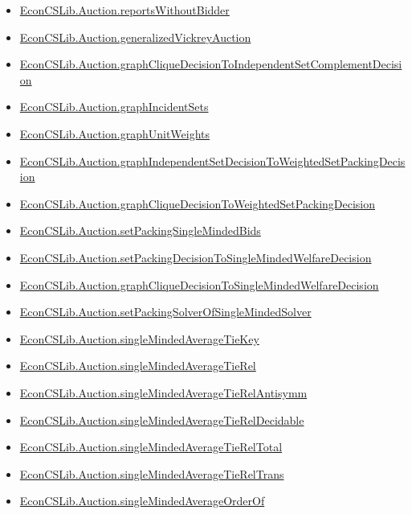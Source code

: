 \documentclass[10pt]{article}
\begin{document}
\begin{itemize}[leftmargin=1.2em]
\begin{itemize}[leftmargin=1.2em]
\item \hyperlink{library-prerequisite-4e808053759bb47d}{EconCSLib.Auction.reportsWithoutBidder}
\item \hyperlink{library-prerequisite-132368aa8dbabb4c}{EconCSLib.Auction.generalizedVickreyAuction}
\item \hyperlink{library-prerequisite-92ac889955e3ef86}{EconCSLib.Auction.graphCliqueDecisionToIndependentSetComplementDecision}
\item \hyperlink{library-prerequisite-5015ec601f976ba3}{EconCSLib.Auction.graphIncidentSets}
\item \hyperlink{library-prerequisite-120e36cc614c5a89}{EconCSLib.Auction.graphUnitWeights}
\item \hyperlink{library-prerequisite-89d05a59d4bd52f7}{EconCSLib.Auction.graphIndependentSetDecisionToWeightedSetPackingDecision}
\item \hyperlink{library-prerequisite-256462336ac7753d}{EconCSLib.Auction.graphCliqueDecisionToWeightedSetPackingDecision}
\item \hyperlink{library-prerequisite-9a18b1a0a2420ffb}{EconCSLib.Auction.setPackingSingleMindedBids}
\item \hyperlink{library-prerequisite-1c67f11f4562c3e1}{EconCSLib.Auction.setPackingDecisionToSingleMindedWelfareDecision}
\item \hyperlink{library-prerequisite-8fc1fd5f747ef6eb}{EconCSLib.Auction.graphCliqueDecisionToSingleMindedWelfareDecision}
\item \hyperlink{library-prerequisite-094b99195cd454a7}{EconCSLib.Auction.setPackingSolverOfSingleMindedSolver}
\item \hyperlink{library-prerequisite-8dc9ca09e1558eb3}{EconCSLib.Auction.singleMindedAverageTieKey}
\item \hyperlink{library-prerequisite-c25f07365caf14a9}{EconCSLib.Auction.singleMindedAverageTieRel}
\item \hyperlink{library-prerequisite-7c45b8e697d4e312}{EconCSLib.Auction.singleMindedAverageTieRelAntisymm}
\item \hyperlink{library-prerequisite-c5ff5d2fc4e41c6d}{EconCSLib.Auction.singleMindedAverageTieRelDecidable}
\item \hyperlink{library-prerequisite-a0d694aeba8e2564}{EconCSLib.Auction.singleMindedAverageTieRelTotal}
\item \hyperlink{library-prerequisite-f683a6a44ba85f72}{EconCSLib.Auction.singleMindedAverageTieRelTrans}
\item \hyperlink{library-prerequisite-e2dbcf19500b0953}{EconCSLib.Auction.singleMindedAverageOrderOf}

\end{itemize}
\end{itemize}
\end{document}
